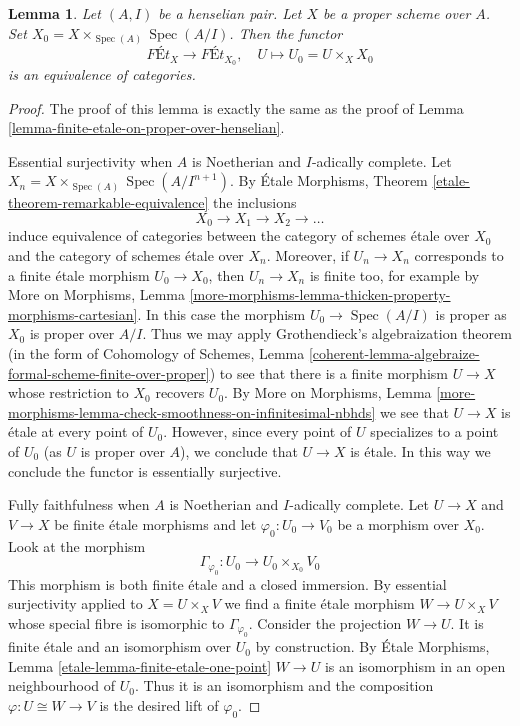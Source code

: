 \documentclass{stacks-project}
\theoremstyle{plain}
\newtheorem{lemma}[subsection]{Lemma}
\theoremstyle{definition}
\theoremstyle{remark}
\numberwithin{equation}{subsection}
\def\Spec{\mathop{\mathrm{Spec}}}
\begin{document}
\begin{lemma}
\label{lemma-finite-etale-on-proper-over-henselian-pair}
Let $(A, I)$ be a henselian pair. Let $X$ be a proper scheme over $A$.
Set $X_0 = X \times_{\Spec(A)} \Spec(A/I)$. Then the functor
$$
\textit{F\'Et}_X \to \textit{F\'Et}_{X_0},\quad
U \longmapsto U_0 = U \times_X X_0
$$
is an equivalence of categories.
\end{lemma}

\begin{proof}
The proof of this lemma is exactly the same as the proof of
Lemma \ref{lemma-finite-etale-on-proper-over-henselian}.

\medskip\noindent
Essential surjectivity when $A$ is Noetherian and $I$-adically complete.
Let $X_n = X \times_{\Spec(A)} \Spec(A/I^{n + 1})$.
By \'Etale Morphisms, Theorem \ref{etale-theorem-remarkable-equivalence}
the inclusions
$$
X_0 \to X_1 \to X_2 \to \ldots
$$
induce equivalence of categories between the category
of schemes \'etale over $X_0$ and the category of schemes
\'etale over $X_n$.
Moreover, if $U_n \to X_n$ corresponds to a finite \'etale
morphism $U_0 \to X_0$, then $U_n \to X_n$ is finite too, for example
by More on Morphisms, Lemma
\ref{more-morphisms-lemma-thicken-property-morphisms-cartesian}.
In this case the morphism $U_0 \to \Spec(A/I)$
is proper as $X_0$ is proper over $A/I$. Thus we may apply
Grothendieck's algebraization theorem
(in the form of
Cohomology of Schemes, Lemma
\ref{coherent-lemma-algebraize-formal-scheme-finite-over-proper})
to see that there is a finite morphism $U \to X$ whose restriction
to $X_0$ recovers $U_0$. By More on Morphisms, Lemma
\ref{more-morphisms-lemma-check-smoothness-on-infinitesimal-nbhds}
we see that $U \to X$ is \'etale at every point of $U_0$.
However, since every point of $U$ specializes to a point of $U_0$
(as $U$ is proper over $A$), we conclude that $U \to X$ is \'etale.
In this way we conclude the functor is essentially surjective.

\medskip\noindent
Fully faithfulness when $A$ is Noetherian and $I$-adically complete.
Let $U \to X$ and $V \to X$ be finite \'etale morphisms and
let $\varphi_0 : U_0 \to V_0$ be a morphism over $X_0$. Look at
the morphism
$$
\Gamma_{\varphi_0} : U_0 \longrightarrow U_0 \times_{X_0} V_0
$$
This morphism is both finite \'etale and a closed immersion.
By essential surjectivity applied to $X = U \times_X V$ we find
a finite \'etale morphism $W \to U \times_X V$ whose special
fibre is isomorphic to $\Gamma_{\varphi_0}$. Consider the projection
$W \to U$. It is finite \'etale and an isomorphism over $U_0$ by
construction. By \'Etale Morphisms, Lemma
\ref{etale-lemma-finite-etale-one-point}
$W \to U$ is an isomorphism in an open neighbourhood of $U_0$.
Thus it is an isomorphism and the composition $\varphi : U \cong W \to V$
is the desired lift of $\varphi_0$.


\end{proof}
\end{document}
